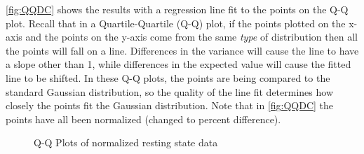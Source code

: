 \autoref{fig:QQDC} shows the 
results with a regression line fit to the points on the Q-Q plot.
Recall that in a Quartile-Quartile (Q-Q) plot, if the points plotted on the 
x-axis and the points
on the y-axis come from the same \emph{type} of distribution then all the points will
fall on a line. Differences in the variance will cause the line to have a slope
other than 1, while differences in the expected value will cause the fitted line
to be shifted. In these Q-Q plots, the points are being compared to the standard
Gaussian distribution, so the quality of the line fit determines how closely the points
fit the Gaussian distribution. Note that in \autoref{fig:QQDC} the points have all been 
normalized (changed to percent difference).
\begin{figure}
\centering
{}


\caption{Q-Q Plots of normalized resting state data}
\label{fig:QQDC}
\end{figure}

